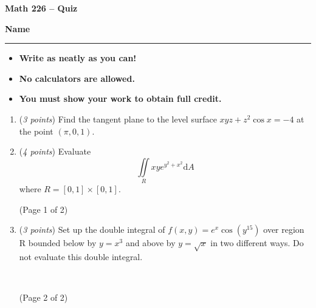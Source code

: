 \documentclass[12 pt]{article}
\begin{document}
  \begin{center}
    \textbf{\hfill Math 226 -- Quiz} \\
  \end{center}
  \medskip

  \noindent
  \textbf{Name}\ \rule{3.5in}{.4pt} \hfill
  \vspace{.1in}
  \hspace*{0.2in}
  \begin{itemize}
    \item \textbf{Write as neatly as you can!}
    \item \textbf{No calculators are allowed.}
    \item \textbf{You must show your work to obtain full credit.}
  \end{itemize}

	\medskip
  \noindent

  \begin{enumerate}
    \item (\textit{3 points}) Find the tangent plane to the level surface
    $xyz+z^2\cos{x}=-4$ at the point $(\pi,0,1)$.
    \vspace{2in}
		\item (\textit{4 points}) Evaluate \[
      \iint\limits_{R} xye^{y^2+x^2}\mathrm{d}A
    \] where $R=[0, 1] \times [0, 1]$.
    \vspace*{\fill}\\
    \begin{center}(Page 1 of 2)\end{center}
    \pagebreak
    \item (\textit{3 points}) Set up the double integral of
    $f(x,y)=e^x\cos(y^{15})$ over region R bounded below by $y=x^3$ and above by
    $y=\sqrt{x}$ in two different ways. Do not evaluate this double integral.
    \begin{figure}[h]
      \centering
    \end{figure}
    \vspace*{\fill}\\
    \begin{center}(Page 2 of 2)\end{center}
  \end{enumerate}
\end{document}
